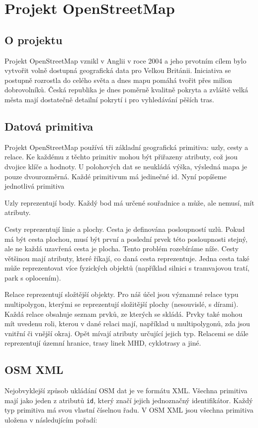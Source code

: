 \chapter{Projekt OpenStreetMap}
\section{O projektu}
Projekt OpenStreetMap\cite{osmweb} vznikl v Anglii v roce 2004 a jeho prvotním cílem bylo
vytvořit volně dostupná geografická data pro Velkou Británii. Iniciativa se
postupně rozrostla do celého světa a dnes mapu pomáhá tvořit přes milion
dobrovolníků. Česká republika je dnes poměrně kvalitně pokryta a zvláště velká
města mají dostatečně detailní pokrytí i pro vyhledávání pěších tras.

\section{Datová primitiva} 
Projekt OpenStreetMap používá tři základní geografická primitiva: uzly, cesty a
relace. Ke každému z těchto primitiv mohou být přiřazeny atributy, což jsou
dvojice klíče a hodnoty. 
U polohových dat se neukládá výška, výsledná mapa je pouze dvourozměrná.
Každé primitivum má jedinečné id.
Nyní popíšeme jednotlivá primitiva

{\tuc Uzly} reprezentují body. Každý bod má určené souřadnice a může, ale nemusí,
mít atributy.

{\tuc Cesty} reprezentují linie a plochy. Cesta je definována posloupností uzlů.
Pokud má být cesta plochou, musí být první a poslední prvek této posloupnosti
stejný, ale ne každá uzavřená cesta je plocha. Tento problém rozebíráme níže.
Cesty většinou mají atributy, které říkají, co daná cesta reprezentuje. Jedna
cesta také může reprezentovat více fyzických objektů (například silnici s
tramvajovou tratí, park s oplocením).

{\tuc Relace} reprezentují složtější objekty. Pro náš účel jsou významné relace
typu multipolygon, kterými se reprezentují složitější plochy (nesouvislé, s
dírami). Každá relace obsahuje seznam prvků, ze kterých se skládá. Prvky také
mohou mít uvedenu roli, kterou v dané relaci mají, například u multipolygonů,
zda jsou vnitřní či vnější okraj. Opět mívají atributy určující jejich typ.
Relacemi se dále reprezentují územní hranice, trasy linek MHD, cyklotrasy a
jiné.

\section{OSM XML}
Nejobvyklejší způsob ukládání OSM dat je ve formátu XML. Všechna primitiva mají
jako jeden z atributů \verb|id|, který značí jejich jednoznačný identifikátor.
Každý typ primitiva má svou vlastní číselnou řadu. V OSM XML jsou
všechna primitiva uložena v následujícím pořadí:

